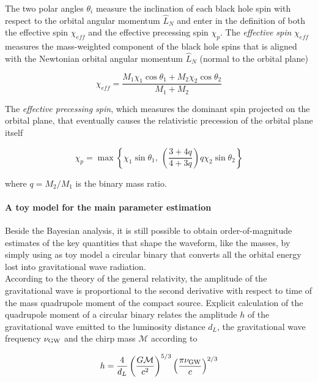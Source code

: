 \documentclass[a4paper,titlepage]{book}     	%
\begin{document}
The two polar angles $\theta_i$ measure the inclination of each black hole spin with respect to the orbital angular momentum $\hat{L}_N$ and enter in the definition of both the effective spin $\chi_{eff}$ and the effective precessing spin $\chi_p$. The \emph{effective spin} $\chi_{eff}$ measures the mass-weighted component of the black hole spins that is aligned with the Newtonian orbital angular momentum $\hat{L}_N$ (normal to the orbital plane)

\begin{equation}\label{eq:chieff}
	\chi_{eff} = \frac{M_1 \chi_1 \cos\theta_1 + M_2 \chi_2 \cos\theta_2}{M_1 + M_2}
\end{equation}

The \emph{effective precessing spin}, which measures the dominant spin projected on the orbital plane, that eventually causes the relativistic precession of the orbital plane itself

\begin{equation}\label{eq:chip}
	\chi_p = \max \left\{\chi_1 \sin\theta_1,~ \left(\frac{3+4q}{4+3q}\right) q\chi_2 \sin\theta_2\right\}
\end{equation}

where $q=M_2/M_1$ is the binary mass ratio. \cite{GWTC-3_interpretation}



\paragraph{A toy model for the main parameter estimation} Beside the Bayesian analysis, it is still possible to obtain order-of-magnitude estimates of the key quantities that shape the waveform, like the masses, by simply using as toy model a circular binary that converts all the orbital energy lost into gravitational wave radiation. \\

According to the theory of the general relativity, the amplitude of the gravitational wave is proportional to the second derivative with respect to time of the mass quadrupole moment of the compact source.  Explicit calculation of the quadrupole moment of a circular binary relates the amplitude $h$  of the gravitational wave emitted to the luminosity distance $d_L$, the gravitational wave frequency $\nu_{\rm GW}$ and the chirp mass $\mathcal{M}$ according to

\begin{equation}\label{eq:h}
h = \frac{4}{d_L} \left(\frac{G \mathcal{M}}{c^2}\right)^{5/3} \left(\frac{\pi \nu_{\rm GW}}{c}\right)^{2/3} 
\end{equation}
\end{document}
